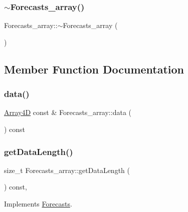 \subsubsection{\texorpdfstring{$\sim$\+Forecasts\+\_\+array()}{~Forecasts\_array()}}
{\footnotesize\ttfamily Forecasts\+\_\+array\+::$\sim$\+Forecasts\+\_\+array (\begin{DoxyParamCaption}{ }\end{DoxyParamCaption})\hspace{0.3cm}{\ttfamily [virtual]}}



\subsection{Member Function Documentation}
\mbox{\label{class_forecasts__array_a989f43aa5d819b50ddd8df5a2f33129d}} 
\subsubsection{\texorpdfstring{data()}{data()}}
{\footnotesize\ttfamily \mbox{\hyperlink{class_array4_d}{Array4D}} const  \& Forecasts\+\_\+array\+::data (\begin{DoxyParamCaption}{ }\end{DoxyParamCaption}) const}

\mbox{\label{class_forecasts__array_aae8790581dc2f2dcfc140c34999588e0}} 
\subsubsection{\texorpdfstring{get\+Data\+Length()}{getDataLength()}}
{\footnotesize\ttfamily size\+\_\+t Forecasts\+\_\+array\+::get\+Data\+Length (\begin{DoxyParamCaption}{ }\end{DoxyParamCaption}) const\hspace{0.3cm}{\ttfamily [override]}, {\ttfamily [virtual]}}



Implements \mbox{\hyperlink{class_forecasts_aeafd542ddff2fc678440d555002dc912}{Forecasts}}.

